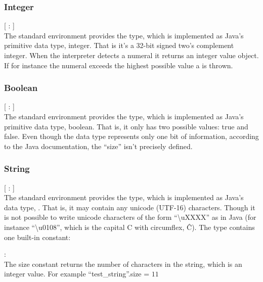 \subsubsection{Integer}

\begin{dlist}
  \item {}[ : ]\\
    The standard environment provides the  type, which is implemented as Java's primitive data type, integer. That is
it's a 32-bit signed two's complement integer. When the interpreter detects a numeral it returns an integer value object. If
for instance the numeral exceeds the highest possible value a  is thrown.
\end{dlist}

\subsubsection{Boolean}

\begin{dlist}
  \item {}[ : ]\\
    The standard environment provides the  type, which is implemented as Java's primitive data type, boolean. That is, it only has two possible values: true and false. Even though the data type represents only one bit of information, according to the Java documentation, the ``size'' isn't precisely defined. 
\end{dlist}

\subsubsection{String}
\begin{dlist}
  \item {}[ : ]\\
    The standard environment provides the  type, which is implemented as Java's data type, . That is, it may contain any unicode (UTF-16) characters. Though it is not possible to write unicode characters of the form ``\textbackslash{}uXXXX'' as in Java (for instance ``\textbackslash{}u0108'', which is the capital C with circumflex, Ĉ). The  type contains one built-in constant:  
  \begin{dlist}
  \item {} : \\
  The size constant returns the number of characters in the string, which is an integer value. For example ``test\_string''.size = $11$
  \end{dlist}
\end{dlist}
